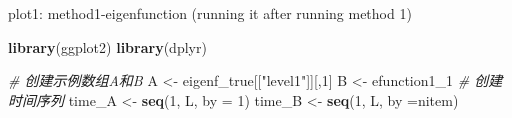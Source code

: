 \documentclass[
]{article}
\newenvironment{Shaded}{\begin{snugshade}}{\end{snugshade}}
\newcommand{\AttributeTok}[1]{\textcolor[rgb]{0.13,0.29,0.53}{#1}}
\newcommand{\CommentTok}[1]{\textcolor[rgb]{0.56,0.35,0.01}{\textit{#1}}}
\newcommand{\DecValTok}[1]{\textcolor[rgb]{0.00,0.00,0.81}{#1}}
\newcommand{\FunctionTok}[1]{\textcolor[rgb]{0.13,0.29,0.53}{\textbf{#1}}}
\newcommand{\NormalTok}[1]{#1}
\newcommand{\OtherTok}[1]{\textcolor[rgb]{0.56,0.35,0.01}{#1}}
\newcommand{\StringTok}[1]{\textcolor[rgb]{0.31,0.60,0.02}{#1}}
\begin{document}
plot1: method1-eigenfunction (running it after running method 1)

\begin{Shaded}
\begin{Highlighting}[]
\FunctionTok{library}\NormalTok{(ggplot2)  }
\FunctionTok{library}\NormalTok{(dplyr)  }

\CommentTok{\# 创建示例数组A和B  }
\NormalTok{A }\OtherTok{\textless{}{-}}\NormalTok{ eigenf\_true[[}\StringTok{"level1"}\NormalTok{]][,}\DecValTok{1}\NormalTok{]}
\NormalTok{B }\OtherTok{\textless{}{-}}\NormalTok{ efunction1\_1}
  \CommentTok{\# 创建时间序列  }
\NormalTok{time\_A }\OtherTok{\textless{}{-}} \FunctionTok{seq}\NormalTok{(}\DecValTok{1}\NormalTok{, L, }\AttributeTok{by =} \DecValTok{1}\NormalTok{)  }
\NormalTok{time\_B }\OtherTok{\textless{}{-}} \FunctionTok{seq}\NormalTok{(}\DecValTok{1}\NormalTok{, L, }\AttributeTok{by =}\NormalTok{nitem)}
  

\end{Highlighting}
\end{Shaded}
\end{document}
